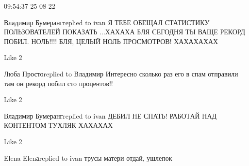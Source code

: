  
 
 
 
 

09:54:37 25-08-22

Владимир Бумерангreplied to ivan
Я ТЕБЕ ОБЕЩАЛ СТАТИСТИКУ ПОЛЬЗОВАТЕЛЕЙ ПОКАЗАТЬ ...ХАХАХА  БЛЯ СЕГОДНЯ ТЫ ВАЩЕ РЕКОРД ПОБИЛ. НОЛЬ!!!! БЛЯ, ЦЕЛЫЙ НОЛЬ ПРОСМОТРОВ! ХАХАХАХАХ

    Like 2

Люба Простоreplied to Владимир
Интересно сколько раз его в спам отправили там он рекорд побил сто процентов!!

    Like 2

Владимир Бумерангreplied to ivan
ДЕБИЛ НЕ СПАТЬ! РАБОТАЙ НАД КОНТЕНТОМ ТУХЛЯК ХАХАХАХ

    Like 2

Elena Elenаreplied to ivan
трусы матери отдай, ушлепок
